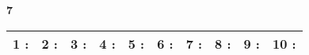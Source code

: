 \documentclass[a4paper, 11pt]{article}
\begin{document}
{\Large\bf 7 } \hspace{1.5cm}
\begin{tabular}{| l|l|l|l|l|l|l|l|l|l| }
\hline
{\large 1 }: \hspace*{0.5cm}
& {\large 2 }: \hspace*{0.5cm}
& {\large 3 }: \hspace*{0.5cm}
& {\large 4 }: \hspace*{0.5cm}
& {\large 5 }: \hspace*{0.5cm}
& {\large 6 }: \hspace*{0.5cm}
& {\large 7 }: \hspace*{0.5cm}
& {\large 8 }: \hspace*{0.5cm}
& {\large 9 }: \hspace*{0.5cm}
& {\large 10 }: \hspace*{0.5cm}
\\ 
 \hline
\end{tabular}
\vspace*{1cm} 
\end{document}
